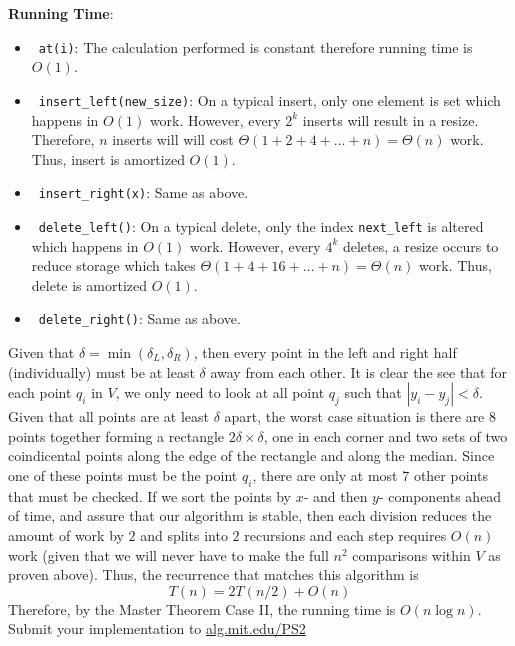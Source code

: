 \documentclass[12pt,twoside]{article}
\begin{document}
\begin{problems}
    \smallbreak

    {\bf Running Time}: 

    \begin{itemize}
        \item \ {\tt at(i)}: The calculation performed is constant therefore
            running time is $ O(1) $.
        \item \ {\tt insert\_left(new\_size)}: On a typical insert, only one
            element is set which happens in $ O(1) $ work. However, every $ 2^k
            $ inserts will result in a resize. Therefore, $ n $ inserts will
            will cost $ \Theta(1 + 2 + 4 + \ldots + n) = \Theta(n) $ work.
            Thus, insert is amortized $ O(1) $.
        \item \ {\tt insert\_right(x)}: Same as above.
        \item \ {\tt delete\_left()}: On a typical delete, only the index
            {\tt next\_left} is altered which happens in $ O(1) $ work.
            However, every $ 4^k $ deletes, a resize occurs to reduce storage
            which takes $ \Theta(1 + 4 + 16 + \ldots + n) = \Theta(n) $ work.
            Thus, delete is amortized $ O(1) $.
        \item \ {\tt delete\_right()}: Same as above.
    \end{itemize}

\newpage
\problem

\begin{problemparts}
\problempart Given that $ \delta = \min(\delta_L, \delta_R) $, then every
    point in the left and right half (individually) must be at least $ \delta
    $ away from each other. It is clear the see that for each point $ q_i $
    in $ V $, we only need to look at all point $ q_j $ such that $ | y_i -
    y_j | < \delta $. Given that all points are at least $ \delta $ apart,
    the worst case situation is there are 8 points together forming a
    rectangle $ 2 \delta \times \delta $, one in each corner and two sets of
    two coindicental points along the edge of the rectangle and along the
    median. Since one of these points must be the point $ q_i $, there are
    only at most 7 other points that must be checked.
\problempart If we sort the points by $ x $- and then $ y $- components ahead
    of time, and assure that our algorithm is stable, then each division
    reduces the amount of work by $ 2 $ and splits into $ 2 $ recursions and
    each step requires $ O(n) $ work (given that we will never have to make
    the full $n ^ 2$ comparisons within $ V $ as proven above). Thus, the
    recurrence that matches this algorithm is
    $$ T(n) = 2 T(n/2) + O(n) $$
    Therefore, by the Master Theorem Case II, the running time is $ O(n \log
    n) $.
\problempart Submit your implementation to {\small\url{alg.mit.edu/PS2}}
\end{problemparts}

\end{problems}
\end{document}
